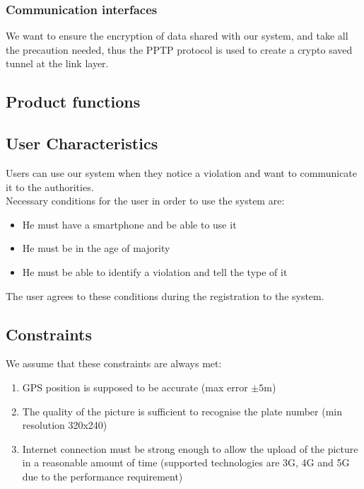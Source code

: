 \subsubsection{Communication interfaces}
	We want to ensure the encryption of data shared with our system, and take all the precaution needed, thus the PPTP protocol is used to create a crypto saved tunnel at the link layer.
\subsection{Product functions}

\subsection{User Characteristics}
	Users can use our system when they notice a violation and want to communicate it to the authorities.\\
 	Necessary conditions for the user in order to use the system are:
 	\begin{itemize}
 		\item He must have a smartphone and be able to use it
 		\item He must be in the age of majority
 		\item He must be able to identify a violation and tell the type of it
 	\end{itemize}
 	The user agrees to these conditions during the registration to the system.
 	
\subsection{Constraints}
	We assume that these constraints are always met:
	\begin{enumerate}[label=\textbf{C\arabic*}]
		\item GPS position is supposed to be accurate (max error $\pm5$m)
		\item The quality of the picture is sufficient to recognise the plate number (min resolution 320x240)
		\item Internet connection must be strong enough to allow the upload of the picture in a reasonable amount of time (supported technologies are 3G, 4G and 5G due to the performance requirement)
	\end{enumerate}
	
